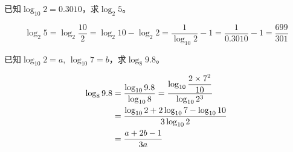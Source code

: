 \begin{example}
已知$\log_{10}2=0.3010$，求$\log_2 5$。
\end{example}

\begin{solution}
\[\log_2 5=\log_2 \frac{10}{2}=\log_2 10-\log_2 2=\frac{1}{\log_{10}2}-1=\frac{1}{0.3010}-1=\frac{699}{301}\] 
\end{solution}    

\begin{example}
    已知$\log_{10}2=a$, $\log_{10}7=b$，求$\log_{8}9.8$。
\end{example}

\begin{solution}
\[\begin{split}
    \log_{8}9.8&=\dfrac{\log_{10}9.8}{\log_{10}8}=\dfrac{\log_{10}\dfrac{2\times 7^2}{10}}{\log_{10}2^3}\\
    &=\dfrac{\log_{10}2+2\log_{10}7-\log_{10}10}{3\log_{10}2}\\
    &=\dfrac{a+2b-1}{3a}
\end{split}\]
\end{solution}

